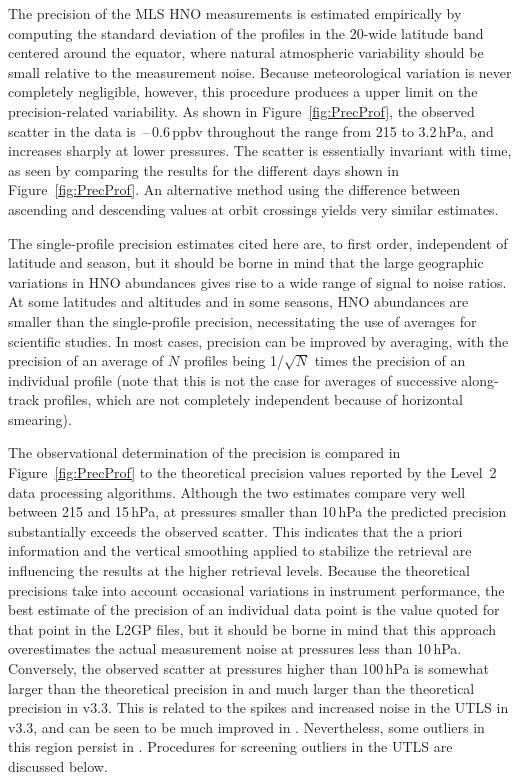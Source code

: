 \documentclass[11pt,draft]{report}
\begin{document}
The precision of the MLS HNO measurements is estimated empirically
by computing the standard deviation of the profiles in the
20\degsym-wide latitude band centered around the equator, where natural
atmospheric variability should be small relative to the measurement
noise.  Because meteorological variation is never completely negligible,
however, this procedure produces a upper limit on the precision-related
variability.  As shown in Figure~\ref{fig:PrecProf}, the observed
scatter in the \thisv data is \,--\,0.6\,ppbv throughout
the range from 215 to 3.2\,hPa, and increases sharply at lower
pressures.  The scatter is essentially invariant with time, as seen by
comparing the results for the different days shown in
Figure~\ref{fig:PrecProf}.  An alternative method using the difference
between ascending and descending values at orbit crossings yields very
similar estimates.

The single-profile precision estimates cited here are, to first order,
independent of latitude and season, but it should be borne in mind that
the large geographic variations in HNO abundances gives rise to a
wide range of signal to noise ratios.  At some latitudes and altitudes
and in some seasons, HNO abundances are smaller than the
single-profile precision, necessitating the use of averages for
scientific studies.  In most cases, precision can be improved by
averaging, with the precision of an average of $N$ profiles being
1/$\sqrt{N}$ times the precision of an individual profile (note that
this is not the case for averages of successive along-track profiles,
which are not completely independent because of horizontal smearing).

The observational determination of the precision is compared in
Figure~\ref{fig:PrecProf} to the theoretical precision values reported
by the Level~2 data processing algorithms.  Although the two estimates
compare very well between 215 and 15\,hPa, at pressures smaller than
10\,hPa the predicted precision substantially exceeds the observed
scatter.  This indicates that the a priori information and the vertical
smoothing applied to stabilize the retrieval are influencing the results
at the higher retrieval levels.  Because the theoretical precisions take
into account occasional variations in instrument performance, the best
estimate of the precision of an individual data point is the value
quoted for that point in the L2GP files, but it should be borne in mind
that this approach overestimates the actual measurement noise at
pressures less than 10\,hPa.  Conversely, the observed scatter at
pressures higher than 100\,hPa is somewhat larger than the theoretical
precision in \thisv and much larger than the theoretical precision in
v3.3.  This is related to the spikes and increased noise in the UTLS in
v3.3, and can be seen to be much improved in \thisv.  Nevertheless, some
outliers in this region persist in \thisv.  Procedures for screening
outliers in the UTLS are discussed below.
\end{document}
